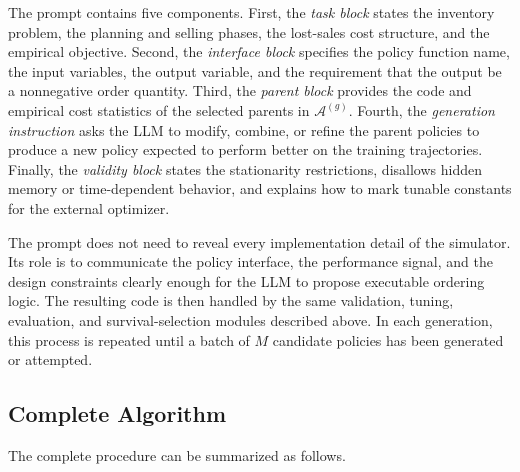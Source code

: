 \documentclass[11pt]{article}
\begin{document}
The prompt contains five components. First, the \emph{task block} states the inventory problem, the planning and selling phases, the lost-sales cost structure, and the empirical objective. Second, the \emph{interface block} specifies the policy function name, the input variables, the output variable, and the requirement that the output be a nonnegative order quantity. Third, the \emph{parent block} provides the code and empirical cost statistics of the selected parents in $\mathcal A^{(g)}$. Fourth, the \emph{generation instruction} asks the LLM to modify, combine, or refine the parent policies to produce a new policy expected to perform better on the training trajectories. Finally, the \emph{validity block} states the stationarity restrictions, disallows hidden memory or time-dependent behavior, and explains how to mark tunable constants for the external optimizer.

The prompt does not need to reveal every implementation detail of the simulator. Its role is to communicate the policy interface, the performance signal, and the design constraints clearly enough for the LLM to propose executable ordering logic. The resulting code is then handled by the same validation, tuning, evaluation, and survival-selection modules described above. In each generation, this process is repeated until a batch of $M$ candidate policies has been generated or attempted.

\subsection{Complete Algorithm}
\label{sec:complete_algorithm}

The complete procedure can be summarized as follows.
\end{document}
